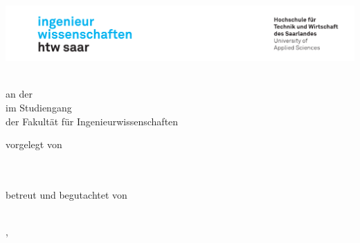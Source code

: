 \begin{titlepage}\linespread{1.5}\selectfont
\includegraphics[width=\linewidth]{Graphics/htwsaar_Logo_inwi_head_VF_4C_crop}
  \begin{center}
    \large  
    \hfill
    \vfill
    \begingroup
      \Large\bfseries\myDegreeType
    \endgroup
		
		\bigskip
		
    \myDegree \\ 
    an der \myUni \\
    im Studiengang \myDegreeCourse \\
    der Fakultät für Ingenieurwissenschaften \\ 
    
  \vfill
	
  \begingroup
    \Large\bfseries\myTitle 
  \endgroup
	
	\bigskip
	
  vorgelegt von \\
  \myName \\
  \mysecondName\\
  \mythirdName
	
	
  \vfill
	
  betreut und begutachtet von \\
  \myFirstProf \\
  
  \vfill
	
  \myLocation, \myTime                   

    \end{center}       
\end{titlepage}   